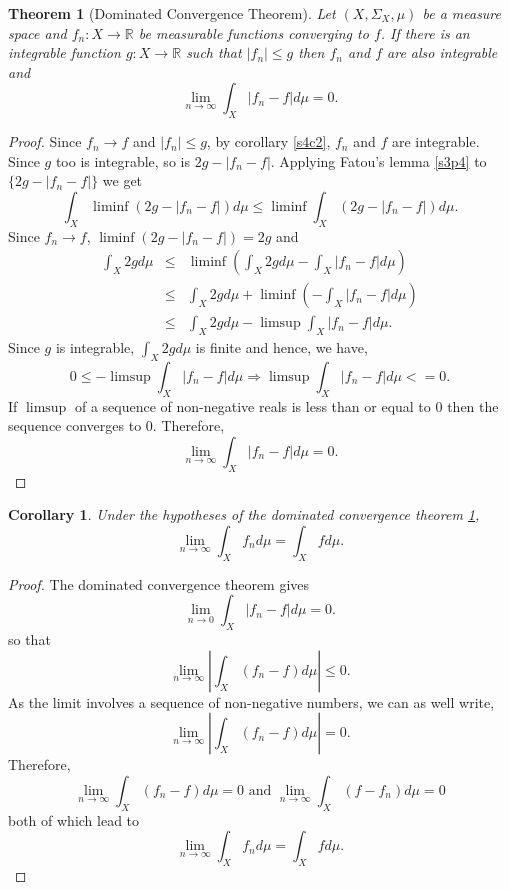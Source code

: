 \documentclass{article}
\newcommand{\sor}{\mathbb{R}}
\theoremstyle{plain}
\newtheorem{thm}{Theorem}
\numberwithin{thm}{section}
\theoremstyle{plain}
\numberwithin{prop}{section}
\theoremstyle{definition}
\numberwithin{defn}{section}
\theoremstyle{remark}
\theoremstyle{plain}
\newtheorem{cor}{Corollary}
\numberwithin{cor}{section}
\numberwithin{equation}{section}
\begin{document}
\begin{thm}[Dominated Convergence Theorem]\label{s4t4} Let $(X, \Sigma_X, \mu)$
be a measure space and $f_n:X \rightarrow \sor$ be measurable functions converging
to $f$. If there is an integrable function $g: X \rightarrow \sor$ such that $|f_n|
\le g$ then $f_n$ and $f$ are also integrable and 
\[
\lim_{n \rightarrow \infty}\int_X |f_n - f|d\mu = 0.
\]
\end{thm}
\begin{proof}
Since $f_n \rightarrow f$ and $|f_n| \le g$, by corollary \ref{s4c2}, $f_n$ and
$f$ are integrable. Since $g$ too is integrable, so is $2g - |f_n - f|$. 
Applying Fatou's lemma \ref{s3p4} to $\{2g - |f_n - f|\}$ we get
\[
\int_X\liminf (2g - |f_n - f|) d\mu \le \liminf\int_X (2g - |f_n - f|)d\mu.
\]
Since $f_n \rightarrow f$, $\liminf(2g - |f_n - f|) = 2g$ and
\begin{eqnarray*}
\int_X 2g d\mu &\le& \liminf\left(\int_X 2g d\mu - \int_X |f_n - f|d\mu\right) \\
 &\le& \int_X 2g d\mu + \liminf\left(-\int_X|f_n - f|d\mu\right) \\
 &\le& \int_X 2g d\mu - \limsup\int_X|f_n - f|d\mu.
\end{eqnarray*}
Since $g$ is integrable, $\int_X 2g d\mu$ is finite and hence, we have,
\[
0 \le -\limsup\int_X|f_n - f|d\mu \Rightarrow \limsup\int_X|f_n - f|d\mu <= 0.
\]
If $\limsup$ of a sequence of non-negative reals is less than or equal to $0$
then the sequence converges to $0$. Therefore,
\[
\lim_{n \rightarrow \infty}\int_X |f_n - f|d\mu = 0.
\]
\end{proof}

\begin{cor}\label{s4c3}
Under the hypotheses of the dominated convergence theorem \ref{s4t4},
\[
\lim_{n \rightarrow \infty}\int_X f_n d\mu = \int_X fd\mu.
\]
\end{cor}
\begin{proof}
The dominated convergence theorem gives
\[
\lim_{n \rightarrow 0}\int_X |f_n - f|d\mu = 0.
\]
so that
\[
\lim_{n \rightarrow \infty}\left|\int_X (f_n - f)d\mu\right| \le 0.
\]
As the limit involves a sequence of non-negative numbers, we can as well write,
\[
\lim_{n \rightarrow \infty}\left|\int_X (f_n - f)d\mu\right| = 0.
\]
Therefore,
\[
\lim_{n \rightarrow \infty}\int_X (f_n - f)d\mu = 0 \text{ and }
\lim_{n \rightarrow \infty}\int_X (f - f_n)d\mu = 0 
\]
both of which lead to
\[
\lim_{n \rightarrow \infty}\int_X f_n d\mu = \int_X fd\mu.
\]
\end{proof}
\end{document}
